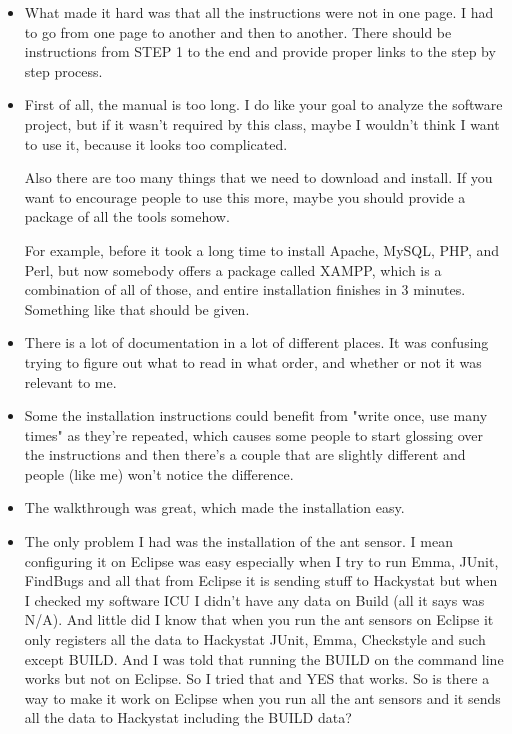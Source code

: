 \begin{itemize}
\item What made it hard was that all the instructions were not in one page.  I had to go from one page to another and then to another.  There should be instructions from STEP 1 to the end and provide proper links to the step by step process.

\item First of all, the manual is too long. I do like your goal to analyze the software project, but if it wasn't required by this class, maybe I wouldn't think I want to use it, because it looks too complicated. 

Also there are too many things that we need to download and install. If you want to encourage people to use this more, maybe you should provide a package of all the tools somehow. 

For example, before it took a long time to install Apache, MySQL, PHP, and Perl, but now somebody offers a package called XAMPP, which is a combination of all of those, and entire installation finishes in 3 minutes. Something like that should be given. 

\item There is a lot of documentation in a lot of different places.  It was confusing trying to figure out what to read in what order, and whether or not it was relevant to me.

\item Some the installation instructions could benefit from "write once, use many times" as they're repeated, which causes some people to start glossing over the instructions and then there's a couple that are slightly different and people (like me) won't notice the difference.

\item The walkthrough was great, which made the installation easy.

\item The only problem I had was the installation of the ant sensor. I mean configuring it on Eclipse was easy especially when I try to run Emma, JUnit, FindBugs and all that from Eclipse it is sending stuff to Hackystat but when I checked my software ICU I didn't have any data on Build (all it says was N/A). And little did I know that when you run the ant sensors on Eclipse it only registers all the data to Hackystat JUnit, Emma, Checkstyle and such except BUILD. And I was told  that running the BUILD on the command line works but not on Eclipse. So I tried that and YES that works. So is there a way to make it work on Eclipse when you run all the ant sensors and it sends all the data to Hackystat including the BUILD data?


\end{itemize}
